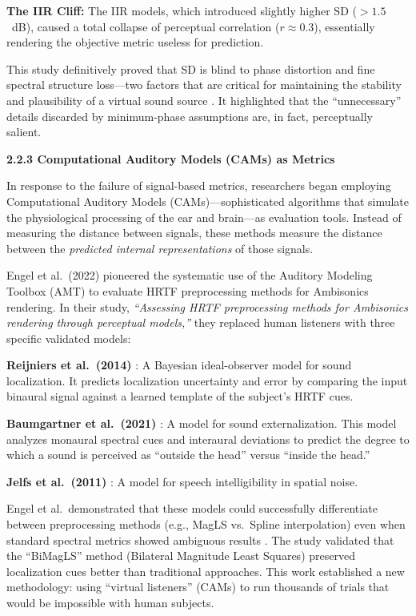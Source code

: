\documentclass[12pt,a4paper]{article}
\begin{document}
\textbf{The IIR Cliff:} The IIR models, which introduced slightly higher SD ($>1.5$~dB), caused a total collapse of perceptual correlation ($r \approx 0.3$), essentially rendering the objective metric useless for prediction.

This study definitively proved that SD is blind to phase distortion and fine spectral structure loss---two factors that are critical for maintaining the stability and plausibility of a virtual sound source \cite{andreopoulou2022}. It highlighted that the ``unnecessary'' details discarded by minimum-phase assumptions are, in fact, perceptually salient.

\textbf{2.2.3 Computational Auditory Models (CAMs) as Metrics}

In response to the failure of signal-based metrics, researchers began employing Computational Auditory Models (CAMs)---sophisticated algorithms that simulate the physiological processing of the ear and brain---as evaluation tools. Instead of measuring the distance between signals, these methods measure the distance between the \textit{predicted internal representations} of those signals.

Engel et al.\ (2022) \cite{engel2022} pioneered the systematic use of the Auditory Modeling Toolbox (AMT) to evaluate HRTF preprocessing methods for Ambisonics rendering. In their study, \textit{``Assessing HRTF preprocessing methods for Ambisonics rendering through perceptual models,''} they replaced human listeners with three specific validated models:

\textbf{Reijniers et al.\ (2014)} \cite{reijniers2014}: A Bayesian ideal-observer model for sound localization. It predicts localization uncertainty and error by comparing the input binaural signal against a learned template of the subject's HRTF cues.

\textbf{Baumgartner et al.\ (2021)} \cite{baumgartner2021}: A model for sound externalization. This model analyzes monaural spectral cues and interaural deviations to predict the degree to which a sound is perceived as ``outside the head'' versus ``inside the head.''

\textbf{Jelfs et al.\ (2011)} \cite{jelfs2011}: A model for speech intelligibility in spatial noise.

Engel et al.\ demonstrated that these models could successfully differentiate between preprocessing methods (e.g., MagLS vs.\ Spline interpolation) even when standard spectral metrics showed ambiguous results \cite{engel2022}. The study validated that the ``BiMagLS'' method (Bilateral Magnitude Least Squares) preserved localization cues better than traditional approaches. This work established a new methodology: using ``virtual listeners'' (CAMs) to run thousands of trials that would be impossible with human subjects.
\end{document}
